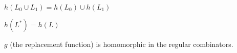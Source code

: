 \documentclass{sigplanconf}
\begin{document}
$h(L_0\cup L_1)=h(L_0)\cup h(L_1)$

$h(L^*)=h(L)$

$g$ (the replacement function) is homomorphic in the regular combinators. 










\end{document}
